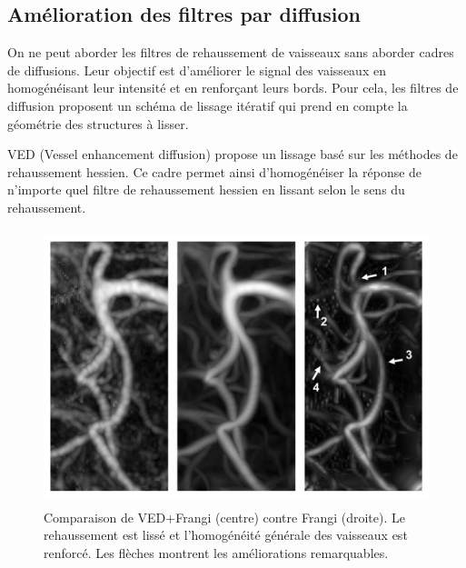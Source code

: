 \subsection{Amélioration des filtres par diffusion}
\label{sec:EA:rehaussement:diffusion}


On ne peut aborder les filtres de rehaussement de vaisseaux sans aborder cadres de diffusions. Leur objectif est d'améliorer le signal des vaisseaux en homogénéisant leur intensité et en renforçant leurs bords. Pour cela, les filtres de diffusion proposent un schéma de lissage itératif qui prend en compte la géométrie des structures à lisser.


VED \cite{Manniesing2006_VED} (Vessel enhancement diffusion) propose un lissage basé sur les méthodes de rehaussement hessien. Ce cadre permet ainsi d'homogénéiser la réponse de n'importe quel filtre de rehaussement hessien en lissant selon le sens du rehaussement.

\begin{figure}[ht]
  \centering
  \includegraphics[height=8cm]{Images/VED.png}
  \caption{Comparaison de VED+Frangi (centre) contre Frangi (droite). Le rehaussement est lissé et l'homogénéité générale des vaisseaux est renforcé. Les flèches montrent les améliorations remarquables.}
  \label{fig:custom_fig}
\end{figure}

